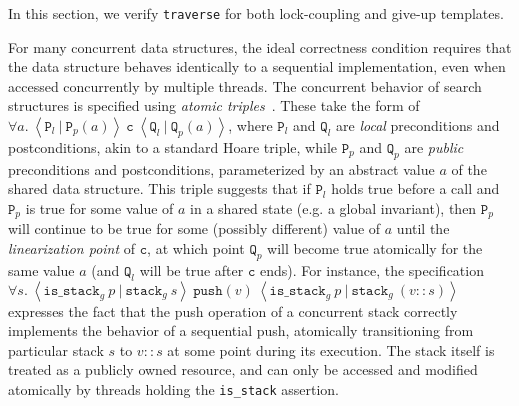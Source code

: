 \documentclass[a4paper,UKenglish,cleveref, autoref, thm-restate]{lipics-v2021}
\begin{document}
In this section, we verify \lstinline{traverse} for both lock-coupling and give-up templates.  

For many concurrent data structures, the ideal correctness condition requires that the data structure behaves identically to a sequential implementation, even when accessed concurrently by multiple threads. The concurrent behavior of search structures is specified using \emph{atomic triples}~\cite{tada}. These take the form of $\forall a.\ \left\langle \texttt{P}_l\ |\ \texttt{P}_p(a) \right\rangle\ \texttt{c}\ \left\langle \texttt{Q}_l\ |\ \texttt{Q}_p(a)\right\rangle$, where $\texttt{P}_l$ and $\texttt{Q}_l$ are \emph{local} preconditions and postconditions, akin to a standard Hoare triple, while $\texttt{P}_p$ and $\texttt{Q}_p$ are \emph{public} preconditions and postconditions, parameterized by an abstract value $a$ of the shared data structure. This triple suggests that if $\texttt{P}_l$ holds true before a call and $\texttt{P}_p$ is true for some value of $a$ in a shared state (e.g. a global invariant), then $\texttt{P}_p$ will continue to be true for some (possibly different) value of $a$ until the \emph{linearization point} of $\texttt{c}$, at which point $\texttt{Q}_p$ will become true atomically for the same value $a$ (and $\texttt{Q}_l$ will be true after $\texttt{c}$ ends). For instance, the specification
$\forall s.\ \left\langle \texttt{is\_stack}_g\ p\ |\ \texttt{stack}_g\ s\right\rangle\ \texttt{push}(v)\ \left\langle \texttt{is\_stack}_g\ p\ |\ \texttt{stack}_g\ (v::s)\right\rangle$
expresses the fact that the push operation of a concurrent stack correctly implements the behavior of a sequential push, atomically transitioning from particular stack $s$ to $v::s$ at some point during its execution. The stack itself is treated as a publicly owned resource, and can only be accessed and modified atomically by threads holding the \texttt{is\_stack} assertion.
\end{document}
